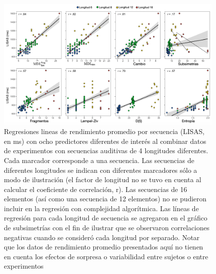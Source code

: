 \begin{figure}[t!]
   \includegraphics[scale=0.8]{figuras/plosbio/journal.pcbi.1008598.g009_SP.PNG}
   
   \centering

   \caption{Regresiones lineas de rendimiento promedio por secuencia (LISAS, en ms) con ocho predictores diferentes de interés al combinar datos de experimentos con secuencias auditivas de 4 longitudes diferentes. Cada marcador corresponde a una secuencia. Las secuencias de diferentes longitudes se indican con diferentes marcadores sólo a modo de ilustración (el factor de longitud no se tuvo en cuenta al calcular el coeficiente de correlación, r). Las secuencias de 16 elementos (así como una secuencia de 12 elementos) no se pudieron incluir en la regresión con complejidad algorítmica. Las líneas de regresión para cada longitud de secuencia se agregaron en el gráfico de subsimetrías con el fin de ilustrar que se observaron correlaciones negativas cuando se consideró cada longitud por separado. Notar que los datos de rendimiento promedio presentados aquí no tienen en cuenta los efectos de sorpresa o variabilidad entre sujetos o entre experimentos}
   \label{PlosBIO-F9}
\end{figure}

